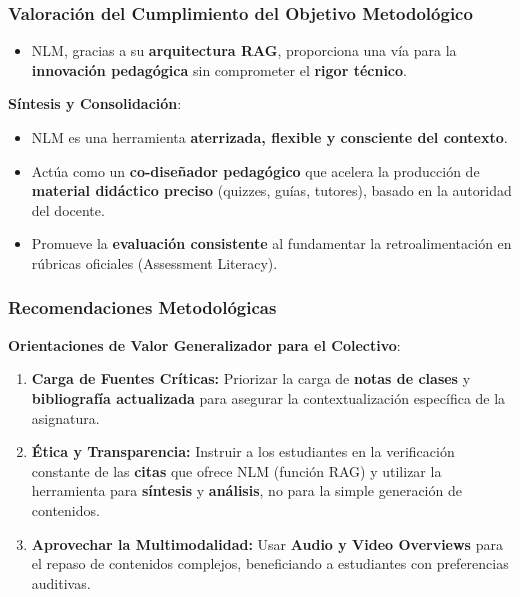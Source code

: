 \documentclass[aspectratio=43]{beamer}
\begin{document}

\begin{frame}
\frametitle{ Valoración del Cumplimiento del Objetivo Metodológico }

\begin{itemize}
    \item NLM, gracias a su \textbf{arquitectura RAG}, proporciona una vía para la \textbf{innovación pedagógica} sin comprometer el \textbf{rigor técnico}.
\end{itemize}

\textbf{Síntesis y Consolidación}:
\begin{itemize}
    \item NLM es una herramienta \textbf{aterrizada, flexible y consciente del contexto}.
    \item Actúa como un \textbf{co-diseñador pedagógico} que acelera la producción de \textbf{material didáctico preciso} (quizzes, guías, tutores), basado en la autoridad del docente.
    \item Promueve la \textbf{evaluación consistente} al fundamentar la retroalimentación en rúbricas oficiales (Assessment Literacy).
\end{itemize}
\end{frame}

\begin{frame}
\frametitle{ Recomendaciones Metodológicas}

\textbf{Orientaciones de Valor Generalizador para el Colectivo}:
\begin{enumerate}
    \item \textbf{Carga de Fuentes Críticas:} Priorizar la carga de \textbf{notas de clases} y \textbf{bibliografía actualizada} para asegurar la contextualización específica de la asignatura.
    \item \textbf{Ética y Transparencia:} Instruir a los estudiantes en la verificación constante de las \textbf{citas} que ofrece NLM (función RAG) y utilizar la herramienta para \textbf{síntesis} y \textbf{análisis}, no para la simple generación de contenidos.
    \item \textbf{Aprovechar la Multimodalidad:} Usar \textbf{Audio y Video Overviews} para el repaso de contenidos complejos, beneficiando a estudiantes con preferencias auditivas.
\end{enumerate}
\end{frame}

\end{document}
